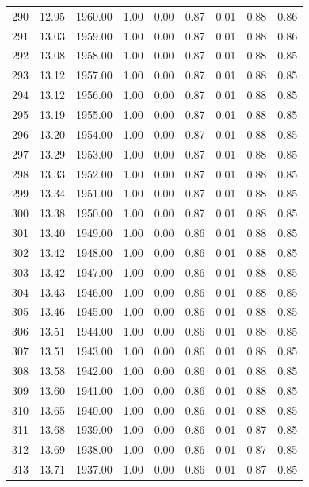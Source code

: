 \documentclass{article}\usepackage[]{graphicx}\usepackage[]{color}
\begin{document}
\begin{longtable}{rrrrrrrrr}
  290 & 12.95 & 1960.00 & 1.00 & 0.00 & 0.87 & 0.01 & 0.88 & 0.86 \\ 
  291 & 13.03 & 1959.00 & 1.00 & 0.00 & 0.87 & 0.01 & 0.88 & 0.86 \\ 
  292 & 13.08 & 1958.00 & 1.00 & 0.00 & 0.87 & 0.01 & 0.88 & 0.85 \\ 
  293 & 13.12 & 1957.00 & 1.00 & 0.00 & 0.87 & 0.01 & 0.88 & 0.85 \\ 
  294 & 13.12 & 1956.00 & 1.00 & 0.00 & 0.87 & 0.01 & 0.88 & 0.85 \\ 
  295 & 13.19 & 1955.00 & 1.00 & 0.00 & 0.87 & 0.01 & 0.88 & 0.85 \\ 
  296 & 13.20 & 1954.00 & 1.00 & 0.00 & 0.87 & 0.01 & 0.88 & 0.85 \\ 
  297 & 13.29 & 1953.00 & 1.00 & 0.00 & 0.87 & 0.01 & 0.88 & 0.85 \\ 
  298 & 13.33 & 1952.00 & 1.00 & 0.00 & 0.87 & 0.01 & 0.88 & 0.85 \\ 
  299 & 13.34 & 1951.00 & 1.00 & 0.00 & 0.87 & 0.01 & 0.88 & 0.85 \\ 
  300 & 13.38 & 1950.00 & 1.00 & 0.00 & 0.87 & 0.01 & 0.88 & 0.85 \\ 
  301 & 13.40 & 1949.00 & 1.00 & 0.00 & 0.86 & 0.01 & 0.88 & 0.85 \\ 
  302 & 13.42 & 1948.00 & 1.00 & 0.00 & 0.86 & 0.01 & 0.88 & 0.85 \\ 
  303 & 13.42 & 1947.00 & 1.00 & 0.00 & 0.86 & 0.01 & 0.88 & 0.85 \\ 
  304 & 13.43 & 1946.00 & 1.00 & 0.00 & 0.86 & 0.01 & 0.88 & 0.85 \\ 
  305 & 13.46 & 1945.00 & 1.00 & 0.00 & 0.86 & 0.01 & 0.88 & 0.85 \\ 
  306 & 13.51 & 1944.00 & 1.00 & 0.00 & 0.86 & 0.01 & 0.88 & 0.85 \\ 
  307 & 13.51 & 1943.00 & 1.00 & 0.00 & 0.86 & 0.01 & 0.88 & 0.85 \\ 
  308 & 13.58 & 1942.00 & 1.00 & 0.00 & 0.86 & 0.01 & 0.88 & 0.85 \\ 
  309 & 13.60 & 1941.00 & 1.00 & 0.00 & 0.86 & 0.01 & 0.88 & 0.85 \\ 
  310 & 13.65 & 1940.00 & 1.00 & 0.00 & 0.86 & 0.01 & 0.88 & 0.85 \\ 
  311 & 13.68 & 1939.00 & 1.00 & 0.00 & 0.86 & 0.01 & 0.87 & 0.85 \\ 
  312 & 13.69 & 1938.00 & 1.00 & 0.00 & 0.86 & 0.01 & 0.87 & 0.85 \\ 
  313 & 13.71 & 1937.00 & 1.00 & 0.00 & 0.86 & 0.01 & 0.87 & 0.85 \\ 

\end{longtable}
\end{document}
